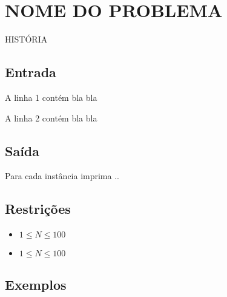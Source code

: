 \section*{NOME DO PROBLEMA}

% 

HISTÓRIA

\subsection*{Entrada}

A linha 1 contém bla bla

A linha 2 contém bla bla

 
\subsection*{Saída}

Para cada instância imprima ..

\subsection*{Restrições}
\begin{itemize}
  \item $1 \leq N \leq 100$

  \item $1 \leq N \leq 100$
\end{itemize}

\subsection*{Exemplos}


